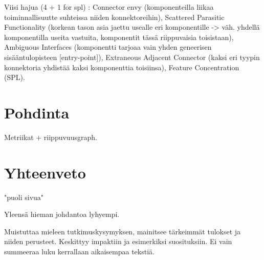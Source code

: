 \documentclass[finnish]{tktltiki2}
\theoremstyle{definition}
\theoremstyle{remark}
\begin{document}
Viisi hajua (4 + 1 for spl) \citep{garcia_toward_2009}: Connector envy (komponenteilla liikaa toiminnallisuutte suhteissa niiden konnektoreihin), Scattered Parasitic Functionality (korkean tason asia jaettu usealle eri komponentille -> väh. yhdellä komponentilla useita vastuita, komponentit tässä riippuvaisia toisistaan), Ambiguous Interfaces (komponentti tarjoaa vain yhden geneerisen sisääntulopisteen [entry-point]), Extraneous Adjacent Connector (kaksi eri tyypin konnektoria yhdistää kaksi komponenttia toisiinsa), Feature Concentration (SPL). 



\section{Pohdinta}

Metriikat + riippuvuusgraph.

\section{Yhteenveto}
"puoli sivua"

Yleensä hieman johdantoa lyhyempi.

Muistuttaa mieleen tutkimuskysymyksen, mainitsee tärkeimmät tulokset ja niiden perusteet. Keskittyy impaktiin ja esimerkiksi suosituksiin. Ei vain summeeraa luku kerrallaan aikaisempaa tekstiä.



%
%
% 
%

%






% 
\end{document}
